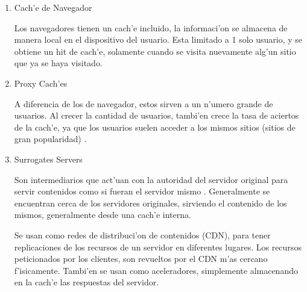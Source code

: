 \begin{enumerate}
\item Cach'e de Navegador

Los navegadores tienen un cach'e incluido, la informaci'on se almacena de manera local en el dispositivo del usuario. Esta limitado a 1 solo usuario, y se obtiene un hit de cach'e, solamente cuando se visita nuevamente alg'un sitio que ya se haya visitado.
\item Proxy Cach'es

A diferencia de los de navegador, estos sirven a un n'umero grande de usuarios. Al crecer la cantidad de usuarios, tambi'en crece la tasa de aciertos de la cach'e, ya que los usuarios suelen acceder a los mismos sitios (sitios de gran popularidad) \citep{duska}.
\item Surrogates Servers

Son intermediarios que act'uan con la autoridad del servidor original para servir contenidos como si fueran el servidor mismo \citep{edgeArch}. Generalmente se encuentran cerca de los servidores originales, sirviendo el contenido de los mismos, generalmente desde una cach'e interna.

Se usan como redes de distribuci'on de contenidos (CDN), para tener replicaciones de los recursos de un servidor en diferentes lugares. Los recursos peticionados por los clientes, son revueltos por el CDN m'as cercano f'isicamente. Tambi'en se usan como aceleradores, simplemente almacenando en la cach'e las respuestas del servidor.
\end{enumerate}

